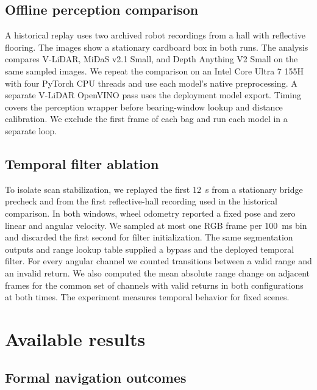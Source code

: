 \documentclass[pdflatex,sn-mathphys-num]{sn-jnl}
\newcommand{\vlidar}{V-LiDAR}
\begin{document}
\subsection{Offline perception comparison}

A historical replay uses two archived robot recordings from a hall with reflective flooring. The images show a stationary cardboard box in both runs. The analysis compares \vlidar{}, MiDaS v2.1 Small, and Depth Anything V2 Small on the same sampled images. We repeat the comparison on an Intel Core Ultra 7 155H with four PyTorch CPU threads and use each model's native preprocessing. A separate V-LiDAR OpenVINO pass uses the deployment model export. Timing covers the perception wrapper before bearing-window lookup and distance calibration. We exclude the first frame of each bag and run each model in a separate loop.

\subsection{Temporal filter ablation}

To isolate scan stabilization, we replayed the first 12~s from a stationary bridge precheck and from the first reflective-hall recording used in the historical comparison. In both windows, wheel odometry reported a fixed pose and zero linear and angular velocity. We sampled at most one RGB frame per 100~ms bin and discarded the first second for filter initialization. The same segmentation outputs and range lookup table supplied a bypass and the deployed temporal filter. For every angular channel we counted transitions between a valid range and an invalid return. We also computed the mean absolute range change on adjacent frames for the common set of channels with valid returns in both configurations at both times. The experiment measures temporal behavior for fixed scenes.

\section{Available results}\label{sec:results}

\subsection{Formal navigation outcomes}\label{sec:formal-outcomes}
\end{document}
